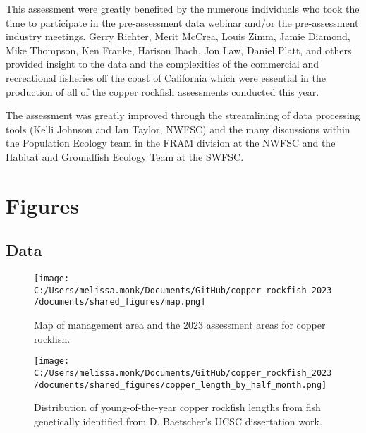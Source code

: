 \documentclass[11pt,
  letterpaper,
]{article}
\begin{document}
This assessment were greatly benefited by the numerous individuals who took the time to participate in the pre-assessment data webinar and/or the pre-assessment industry meetings. Gerry Richter, Merit McCrea, Louis Zimm, Jamie Diamond, Mike Thompson, Ken Franke, Harison Ibach, Jon Law, Daniel Platt, and others provided insight to the data and the complexities of the commercial and recreational fisheries off the coast of California which were essential in the production of all of the copper rockfish assessments conducted this year.

The assessment was greatly improved through the streamlining of data processing tools (Kelli Johnson and Ian Taylor, NWFSC) and the many discussions within the Population Ecology team in the FRAM division at the NWFSC and the Habitat and Groundfish Ecology Team at the SWFSC.

\clearpage

\section{Figures}\label{figures}

\subsection{Data}\label{data-1}

\begin{figure}
{\centering
\texttt{[image: C:/Users/melissa.monk/Documents/GitHub/copper\_rockfish\_2023/documents/shared\_figures/map.png]}
}
\caption{Map of management area and the 2023 assessment areas for copper rockfish.\label{fig:ca-map}}
\end{figure}

\begin{figure}
{\centering
\texttt{[image: C:/Users/melissa.monk/Documents/GitHub/copper\_rockfish\_2023/documents/shared\_figures/copper\_length\_by\_half\_month.png]}
}
\caption{Distribution of young-of-the-year copper rockfish lengths from fish genetically identified from D. Baetscher's UCSC dissertation work.\label{fig:copper-smurf-length}}
\end{figure}
\end{document}
